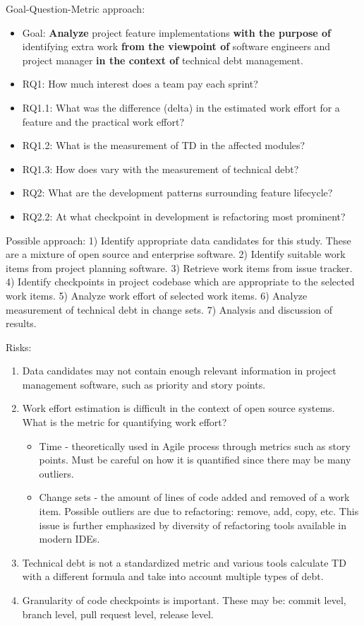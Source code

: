 \documentclass{mprop}
\begin{document}
Goal-Question-Metric approach:
\begin{itemize}
	\item Goal: \textbf{Analyze} project feature implementations \textbf{with the purpose of} identifying extra work \textbf{from the viewpoint of} software engineers and project manager \textbf{in the context of} technical debt management.
	\item RQ1: How much interest does a team pay each sprint?
	\item RQ1.1: What was the difference (delta) in the estimated work effort for a feature and the practical work effort?
	\item RQ1.2: What is the measurement of TD in the affected modules?
	\item RQ1.3: How does vary with the measurement of technical debt?
	\item RQ2: What are the development patterns surrounding feature lifecycle?
	\item RQ2.2: At what checkpoint in development is refactoring most prominent?
\end{itemize}

Possible approach:
1) Identify appropriate data candidates for this study. These are a mixture of open source and enterprise software.
2) Identify suitable work items from project planning software.
3) Retrieve work items from issue tracker.
4) Identify checkpoints in project codebase which are appropriate to the selected work items.
5) Analyze work effort of selected work items.
6) Analyze measurement of technical debt in change sets.
7) Analysis and discussion of results.

Risks:
\begin{enumerate}
	\item Data candidates may not contain enough relevant information in project management software, such as priority and story points.
	\item Work effort estimation is difficult in the context of open source systems. What is the metric for quantifying work effort?
	      \begin{itemize}
		      \item Time - theoretically used in Agile process through metrics such as story points.
		            Must be careful on how it is quantified since there may be many outliers.
		      \item Change sets - the amount of lines of code added and removed of a work item.
		            Possible outliers are due to refactoring: remove, add, copy, etc.
		            This issue is further emphasized by diversity of refactoring tools available in modern IDEs.
	      \end{itemize}
	\item Technical debt is not a standardized metric and various tools calculate TD with a different formula and take into account multiple types of debt.
	\item Granularity of code checkpoints is important. These may be: commit level, branch level, pull request level, release level.
\end{enumerate}
\end{document}
